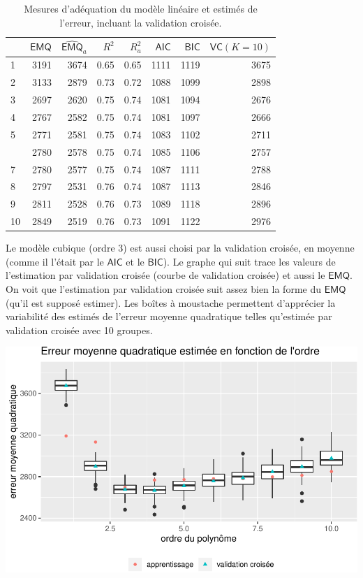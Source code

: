 \documentclass[
  11pt,
  letterpaper,
]{book}
\theoremstyle{definition}
\theoremstyle{definition}
\theoremstyle{definition}
\theoremstyle{remark}
\begin{document}
\begin{table}

\caption{\label{tab:02-table2}Mesures d'adéquation du modèle linéaire et estimés de l'erreur, incluant la validation croisée.}
\centering
\begin{tabular}[t]{lrrrrrrr}
\toprule
  & \(\mathsf{EMQ}\) & \(\widehat{\mathsf{EMQ}}_a\) & \(R^2\) & \(R^2_a\) & \(\mathsf{AIC}\) & \(\mathsf{BIC}\) & \(\mathsf{VC} (K=10)\)\\
\midrule
1 & 3191 & 3674 & 0.65 & 0.65 & 1111 & 1119 & 3675\\
2 & 3133 & 2879 & 0.73 & 0.72 & 1088 & 1099 & 2898\\
3 & 2697 & 2620 & 0.75 & 0.74 & 1081 & 1094 & 2676\\
4 & 2767 & 2582 & 0.75 & 0.74 & 1081 & 1097 & 2666\\
5 & 2771 & 2581 & 0.75 & 0.74 & 1083 & 1102 & 2711\\
\addlinespace
6 & 2780 & 2578 & 0.75 & 0.74 & 1085 & 1106 & 2757\\
7 & 2780 & 2577 & 0.75 & 0.74 & 1087 & 1111 & 2788\\
8 & 2797 & 2531 & 0.76 & 0.74 & 1087 & 1113 & 2846\\
9 & 2811 & 2528 & 0.76 & 0.73 & 1089 & 1118 & 2896\\
10 & 2849 & 2519 & 0.76 & 0.73 & 1091 & 1122 & 2976\\
\bottomrule
\end{tabular}
\end{table}

Le modèle cubique (ordre 3) est aussi choisi par la validation croisée, en moyenne (comme il l'était par le \(\mathsf{AIC}\) et le \(\mathsf{BIC}\)). Le graphe qui suit trace les valeurs de l'estimation par validation croisée (courbe de validation croisée) et aussi le \(\mathsf{EMQ}\). On voit que l'estimation par validation croisée suit assez bien la forme du \(\mathsf{EMQ}\) (qu'il est supposé estimer). Les boîtes à moustache permettent d'apprécier la variabilité des estimés de l'erreur moyenne quadratique telles qu'estimée par validation croisée avec 10 groupes.

\begin{center}\includegraphics[width=0.7\linewidth]{MATH60602_files/figure-latex/plotcv-1} \end{center}
\end{document}

